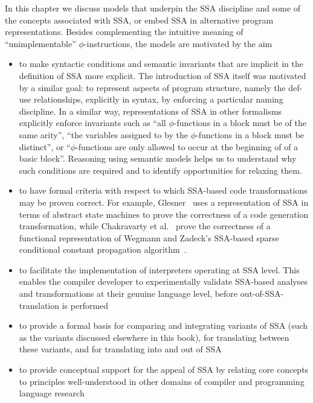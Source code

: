 \label{section:Part1:Semantics:Intro}
In this chapter we discuss models that underpin the SSA discipline and
some of the concepts associated with SSA, or embed SSA in alternative
program representations. Besides complementing the intuitive meaning
of ``unimplementable'' $\phi$-instructions, the models are motivated
by the aim
\begin{itemize}
\item to make syntactic conditions and semantic invariants that are
  implicit in the definition of SSA more explicit. The introduction of
  SSA itself was motivated by a similar goal: to represent aspects of
  program structure, namely the def-use relationships, explicitly in
  syntax, by enforcing a particular naming discipline. In a similar
  way, representations of SSA in other formalisms explicitly enforce
  invariants such as ``all $\phi$-functions in a block must be of the
  same arity'', ``the variables assigned to by the $\phi$-functions in
  a block must be distinct'', or ``$\phi$-functions are only allowed
  to occur at the beginning of of a basic block''. Reasoning using
  semantic models helps us to understand why such conditions are
  required and to identify opportunities for relaxing them.
\item to have formal criteria with respect to which SSA-based code
  transformations may be proven correct. For example,
  Glesner~\cite{DBLP:conf/asm/Glesner04} uses a representation of SSA
  in terms of abstract state machines to prove the correctness of a
  code generation transformation, while Chakravarty et
  al.~\cite{ChakravartyKZ:COCV03} prove the correctness of a
  functional representation of Wegmann and Zadeck's SSA-based sparse
  conditional constant propagation
  algorithm~\cite{WegmannZ:Toplas1991}.
\item to facilitate the implementation of interpreters operating at
  SSA level. This enables the compiler developer to experimentally
  validate SSA-based analyses and transformations at their genuine
  language level, before out-of-SSA-translation is performed
\item to provide a formal basis for comparing and integrating variants
  of SSA (such as the variants discussed elsewhere in this book), for
  translating between these variants, and for translating into and out
  of SSA
\item to provide conceptual support for the appeal of SSA by relating
  core concepts to principles well-understood in other domains of
  compiler and programming language research
\end{itemize}

